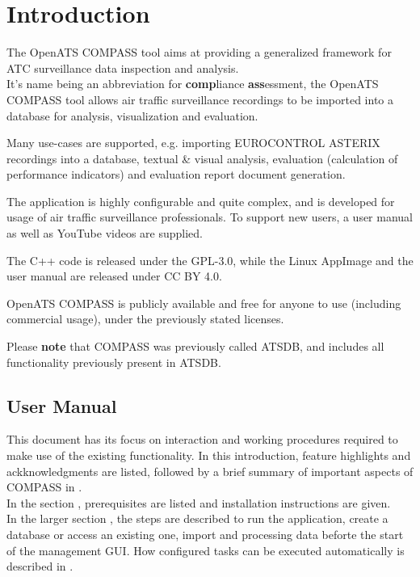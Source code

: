 \chapter{Introduction}

The OpenATS COMPASS tool aims at providing a generalized framework for ATC surveillance data inspection and analysis. \\

It’s name being an abbreviation for \textbf{comp}liance \textbf{ass}essment, the OpenATS COMPASS tool allows air traffic surveillance recordings to be imported into a database for analysis, visualization and evaluation.

Many use-cases are supported, e.g. importing EUROCONTROL ASTERIX recordings into a database, textual \& visual analysis, evaluation (calculation of performance indicators) and evaluation report document generation.

The application is highly configurable and quite complex, and is developed for usage of air traffic surveillance professionals. To support new users, a user manual as well as YouTube videos are supplied.

The C++ code is released under the GPL-3.0, while the Linux AppImage and the user manual are released under CC BY 4.0.

OpenATS COMPASS is publicly available and free for anyone to use (including commercial usage), under the previously stated licenses.

Please \textbf{note} that COMPASS was previously called ATSDB, and includes all functionality previously present in ATSDB. \\

\section{User Manual}

This document has its focus on interaction and working procedures required to make use of the existing
functionality. In this introduction, feature highlights and ackknowledgments are listed, followed by a brief summary of important aspects of  COMPASS in . \\

In the section , prerequisites are listed and installation instructions are given. \\

In the larger section , the steps are described to run the application, create a database or access an existing one, import and processing data beforte the start of the management GUI. How configured tasks can be executed automatically is described in . \\

